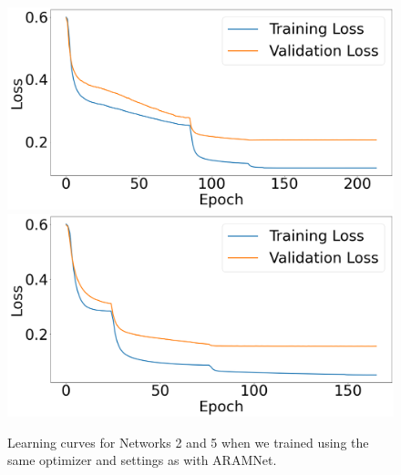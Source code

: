 \begin{figure}
    \centering
    \begin{minipage}{\textwidth}      
        \includegraphics[width=.49\textwidth]{figures/explore-train-loss/network-2.png}\hfill
        \includegraphics[width=.49\textwidth]{figures/explore-train-loss/network-5.png}
    \end{minipage}
    \label{Figure:Training-Loss-2-and-5}
    \caption{Learning curves for Networks 2 and 5 when we trained using the same optimizer and settings as with ARAMNet.}
\end{figure}